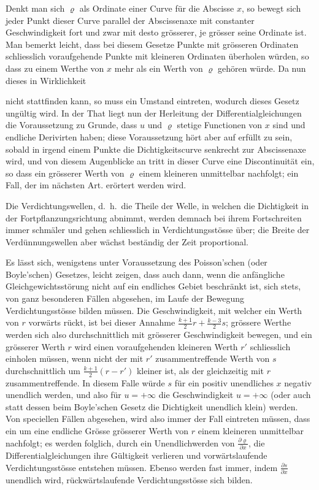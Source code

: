 \documentclass[12pt,a4paper]{article}
\begin{document}
Denkt man sich $\varrho$ als Ordinate einer Curve f\"ur die Abscisse $x$, so bewegt sich jeder Punkt dieser Curve parallel der Abscissenaxe mit constanter Geschwindigkeit fort und zwar mit desto gr\"osserer, je gr\"osser seine Ordinate ist. Man bemerkt leicht, dass bei diesem Gesetze Punkte mit gr\"osseren Ordinaten schliesslich voraufgehende Punkte mit kleineren Ordinaten \"uberholen w\"urden, so dass zu einem Werthe von $x$ mehr als ein Werth von $\varrho$ geh\"oren w\"urde. Da nun dieses in Wirklichkeit

nicht stattfinden kann, so muss ein Umstand eintreten, wodurch dieses Gesetz ung\"ultig wird. In der That liegt nun der Herleitung der Differentialgleichungen die Voraussetzung zu Grunde, dass $u$ und $\varrho$ stetige Functionen von $x$ sind und endliche Derivirten haben; diese Voraussetzung h\"ort aber auf erf\"ullt zu sein, sobald in irgend einem Punkte die Dichtigkeitscurve senkrecht zur Abscissenaxe wird, und von diesem Augenblicke an tritt in dieser Curve eine Discontinuit\"at ein, so dass ein gr\"osserer Werth von $\varrho$ einem kleineren unmittelbar nachfolgt; ein Fall, der im n\"achsten Art. er\"ortert werden wird.

Die Verdichtungswellen, d.~h.~die Theile der Welle, in welchen die Dichtigkeit in der Fortpflanzungsrichtung abnimmt, werden demnach bei ihrem Fortschreiten immer schm\"aler und gehen schliesslich in Verdichtungsst\"osse \"uber; die Breite der Verd\"unnungswellen aber w\"achst best\"andig der Zeit proportional.

Es l\"asst sich, wenigstens unter Voraussetzung des Poisson'schen (oder Boyle'schen) Gesetzes, leicht zeigen, dass auch dann, wenn die anf\"angliche Gleichgewichtsst\"orung nicht auf ein endliches Gebiet beschr\"ankt ist, sich stets, von ganz besonderen F\"allen abgesehen, im Laufe der Bewegung Verdichtungsst\"osse bilden m\"ussen. Die Geschwindigkeit, mit welcher ein Werth von $r$ vorw\"arts r\"uckt, ist bei dieser Annahme $\frac{k+1}{2}r + \frac{k-3}{2}s$; gr\"ossere Werthe werden sich also durchschnittlich mit gr\"osserer Geschwindigkeit bewegen, und ein gr\"osserer Werth $r$ wird einen voraufgehenden kleineren Werth $r'$ schliesslich einholen m\"ussen, wenn nicht der mit $r'$ zusammentreffende Werth von $s$ durchschnittlich um $\frac{k+1}{2}(r - r')$ kleiner ist, als der gleichzeitig mit $r$ zusammentreffende. In diesem Falle w\"urde $s$ f\"ur ein positiv unendliches $x$ negativ unendlich werden, und also f\"ur $u = +\infty$ die Geschwindigkeit $u = +\infty$ (oder auch statt dessen beim Boyle'schen Gesetz die Dichtigkeit unendlich klein) werden. Von speciellen F\"allen abgesehen, wird also immer der Fall eintreten m\"ussen, dass ein um eine endliche Gr\"osse gr\"osserer Werth von $r$ einem kleineren unmittelbar nachfolgt; es werden folglich, durch ein Unendlichwerden von $\frac{\partial\varrho}{\partial x}$, die Differentialgleichungen ihre G\"ultigkeit verlieren und vorw\"artslaufende Verdichtungsst\"osse entstehen m\"ussen. Ebenso werden fast immer, indem $\frac{\partial s}{\partial x}$ unendlich wird, r\"uckw\"artslaufende Verdichtungsst\"osse sich bilden.
\end{document}
